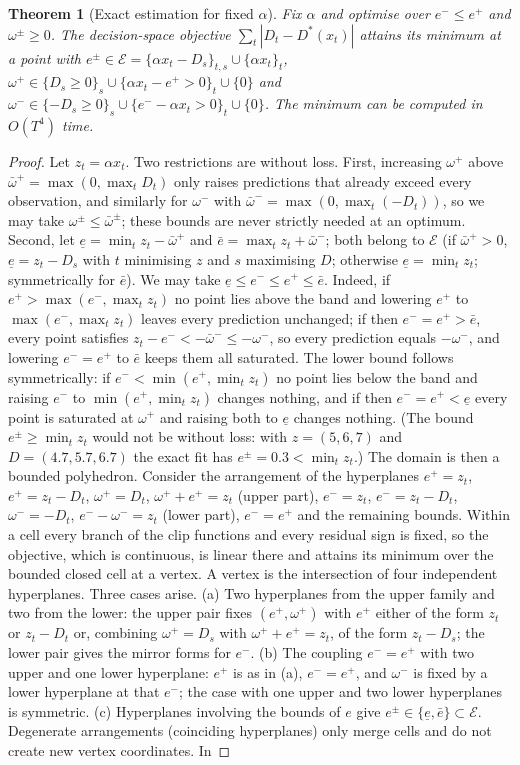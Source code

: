 \documentclass[pdflatex,sn-basic]{sn-jnl}
\theoremstyle{thmstyleone}\newtheorem{proposition}{Proposition}\newtheorem{theorem}{Theorem}
\theoremstyle{thmstylethree}\newtheorem{remark}{Remark}
\begin{document}
\begin{theorem}[Exact estimation for fixed $\alpha$]\label{thm:exact}
Fix $\alpha$ and optimise over $e^-\le e^+$ and $\omega^\pm\ge0$. The decision-space objective $\sum_t|D_t-D^*(x_t)|$ attains its minimum at a point with $e^\pm\in\mathcal{E}=\{\alpha x_t-D_s\}_{t,s}\cup\{\alpha x_t\}_t$, $\omega^+\in\{D_s\ge0\}_s\cup\{\alpha x_t-e^+>0\}_t\cup\{0\}$ and $\omega^-\in\{-D_s\ge0\}_s\cup\{e^--\alpha x_t>0\}_t\cup\{0\}$. The minimum can be computed in $O(T^4)$ time.
\end{theorem}
\begin{proof}
Let $z_t=\alpha x_t$. Two restrictions are without loss. First, increasing $\omega^+$ above $\bar\omega^+=\max(0,\max_tD_t)$ only raises predictions that already exceed every observation, and similarly for $\omega^-$ with $\bar\omega^-=\max(0,\max_t(-D_t))$, so we may take $\omega^\pm\le\bar\omega^\pm$; these bounds are never strictly needed at an optimum. Second, let $\underline e=\min_tz_t-\bar\omega^+$ and $\bar e=\max_tz_t+\bar\omega^-$; both belong to $\mathcal{E}$ (if $\bar\omega^+>0$, $\underline e=z_t-D_s$ with $t$ minimising $z$ and $s$ maximising $D$; otherwise $\underline e=\min_tz_t$; symmetrically for $\bar e$). We may take $\underline e\le e^-\le e^+\le\bar e$. Indeed, if $e^+>\max(e^-,\max_tz_t)$ no point lies above the band and lowering $e^+$ to $\max(e^-,\max_tz_t)$ leaves every prediction unchanged; if then $e^-=e^+>\bar e$, every point satisfies $z_t-e^-<-\bar\omega^-\le-\omega^-$, so every prediction equals $-\omega^-$, and lowering $e^-=e^+$ to $\bar e$ keeps them all saturated. The lower bound follows symmetrically: if $e^-<\min(e^+,\min_tz_t)$ no point lies below the band and raising $e^-$ to $\min(e^+,\min_tz_t)$ changes nothing, and if then $e^-=e^+<\underline e$ every point is saturated at $\omega^+$ and raising both to $\underline e$ changes nothing. (The bound $e^\pm\ge\min_tz_t$ would not be without loss: with $z=(5,6,7)$ and $D=(4.7,5.7,6.7)$ the exact fit has $e^\pm=0.3<\min_tz_t$.) The domain is then a bounded polyhedron. Consider the arrangement of the hyperplanes $e^+=z_t$, $e^+=z_t-D_t$, $\omega^+=D_t$, $\omega^++e^+=z_t$ (upper part), $e^-=z_t$, $e^-=z_t-D_t$, $\omega^-=-D_t$, $e^--\omega^-=z_t$ (lower part), $e^-=e^+$ and the remaining bounds. Within a cell every branch of the clip functions and every residual sign is fixed, so the objective, which is continuous, is linear there and attains its minimum over the bounded closed cell at a vertex. A vertex is the intersection of four independent hyperplanes. Three cases arise. (a) Two hyperplanes from the upper family and two from the lower: the upper pair fixes $(e^+,\omega^+)$ with $e^+$ either of the form $z_t$ or $z_t-D_t$ or, combining $\omega^+=D_s$ with $\omega^++e^+=z_t$, of the form $z_t-D_s$; the lower pair gives the mirror forms for $e^-$. (b) The coupling $e^-=e^+$ with two upper and one lower hyperplane: $e^+$ is as in (a), $e^-=e^+$, and $\omega^-$ is fixed by a lower hyperplane at that $e^-$; the case with one upper and two lower hyperplanes is symmetric. (c) Hyperplanes involving the bounds of $e$ give $e^\pm\in\{\underline e,\bar e\}\subset\mathcal{E}$. Degenerate arrangements (coinciding hyperplanes) only merge cells and do not create new vertex coordinates. In 
\end{proof}
\end{document}
